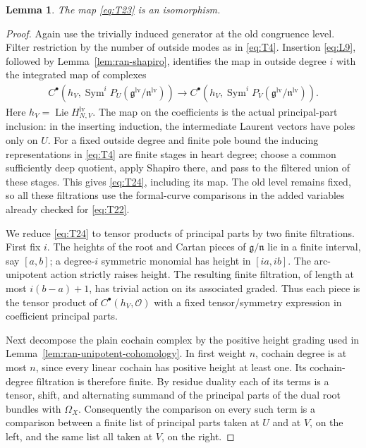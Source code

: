 \documentclass[11pt]{article}
\numberwithin{equation}{section}
\newtheorem{lemma}[theorem]{Lemma}
\theoremstyle{definition}
\theoremstyle{remark}
\begin{document}
\begin{lemma}\label{lem:ran-two-insertions}
The map \eqref{eq:T23} is an isomorphism.
\end{lemma}

\begin{proof}
Again use the trivially induced generator at the old congruence level.
Filter restriction by the number of outside modes as in \eqref{eq:T4}.
Insertion \eqref{eq:L9}, followed by Lemma~\ref{lem:ran-shapiro}, identifies
the map in outside degree $i$ with the integrated map of complexes
\begin{equation}\label{eq:T24}
\begin{aligned}
 C^\bullet\!\left(h_V,
       \operatorname{Sym}^{i}P_U
          (\mathfrak g^{\mathrm{lv}}/\mathfrak n^{\mathrm{lv}})\right)
 \longrightarrow
 C^\bullet\!\left(h_V,
       \operatorname{Sym}^{i}P_V
          (\mathfrak g^{\mathrm{lv}}/\mathfrak n^{\mathrm{lv}})\right).
\end{aligned}
\end{equation}
Here $h_V=\operatorname{Lie}H_{N,V}^{\mathrm{lv}}$.  The map on the
coefficients is the actual principal-part inclusion: in the inserting
induction, the intermediate Laurent vectors have poles only on $U$.
For a fixed outside degree and finite pole bound the inducing
representations in \eqref{eq:T4} are finite stages in heart degree; choose
a common sufficiently deep quotient, apply Shapiro there, and pass to the
filtered union of these stages.  This gives \eqref{eq:T24}, including its
map.  The old level remains fixed, so all these filtrations use the
formal-curve comparisons in the added variables already checked for
\eqref{eq:T22}.

We reduce \eqref{eq:T24} to tensor products of principal parts by two
finite filtrations.  First fix $i$.  The heights of the root and Cartan
pieces of $\mathfrak g/\mathfrak n$ lie in a finite interval, say
$[a,b]$; a degree-$i$ symmetric monomial has height in $[ia,ib]$.
The arc-unipotent action strictly raises height.  The resulting finite
filtration, of length at most $i(b-a)+1$, has trivial action on its
associated graded.  Thus each piece is the tensor product of
$C^\bullet(h_V,\mathcal O)$ with a fixed tensor/symmetry expression in
coefficient principal parts.

Next decompose the plain cochain complex by the positive height grading
used in Lemma~\ref{lem:ran-unipotent-cohomology}.  In first weight $n$,
cochain degree is at most $n$, since every linear cochain has positive
height at least one.  Its cochain-degree filtration is therefore finite.
By residue duality each of its terms is a tensor, shift, and alternating
summand of the principal parts of the dual root bundles with
$\Omega_X$.  Consequently the comparison on every such term is a
comparison between a finite list of principal parts taken at $U$ and at
$V$, on the left, and the same list all taken at $V$, on the right.


\end{proof}
\end{document}
